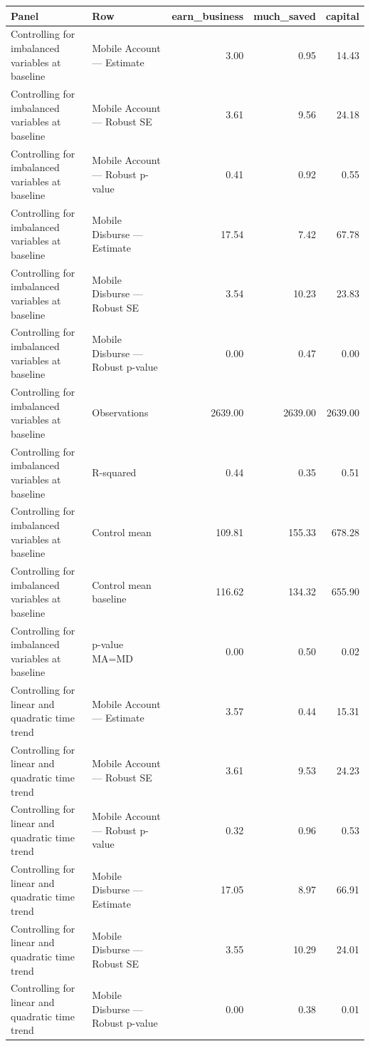 
\begin{tabular}{llrrr}
\toprule
Panel & Row & earn\_business & much\_saved & capital\\
\midrule
Controlling for imbalanced variables at baseline & Mobile Account — Estimate & 3.00 & 0.95 & 14.43\\
Controlling for imbalanced variables at baseline & Mobile Account — Robust SE & 3.61 & 9.56 & 24.18\\
Controlling for imbalanced variables at baseline & Mobile Account — Robust p-value & 0.41 & 0.92 & 0.55\\
Controlling for imbalanced variables at baseline & Mobile Disburse — Estimate & 17.54 & 7.42 & 67.78\\
Controlling for imbalanced variables at baseline & Mobile Disburse — Robust SE & 3.54 & 10.23 & 23.83\\
\addlinespace
Controlling for imbalanced variables at baseline & Mobile Disburse — Robust p-value & 0.00 & 0.47 & 0.00\\
Controlling for imbalanced variables at baseline & Observations & 2639.00 & 2639.00 & 2639.00\\
Controlling for imbalanced variables at baseline & R-squared & 0.44 & 0.35 & 0.51\\
Controlling for imbalanced variables at baseline & Control mean & 109.81 & 155.33 & 678.28\\
Controlling for imbalanced variables at baseline & Control mean baseline & 116.62 & 134.32 & 655.90\\
\addlinespace
Controlling for imbalanced variables at baseline & p-value MA=MD & 0.00 & 0.50 & 0.02\\
Controlling for linear and quadratic time trend & Mobile Account — Estimate & 3.57 & 0.44 & 15.31\\
Controlling for linear and quadratic time trend & Mobile Account — Robust SE & 3.61 & 9.53 & 24.23\\
Controlling for linear and quadratic time trend & Mobile Account — Robust p-value & 0.32 & 0.96 & 0.53\\
Controlling for linear and quadratic time trend & Mobile Disburse — Estimate & 17.05 & 8.97 & 66.91\\
\addlinespace
Controlling for linear and quadratic time trend & Mobile Disburse — Robust SE & 3.55 & 10.29 & 24.01\\
Controlling for linear and quadratic time trend & Mobile Disburse — Robust p-value & 0.00 & 0.38 & 0.01\\

\end{tabular}
